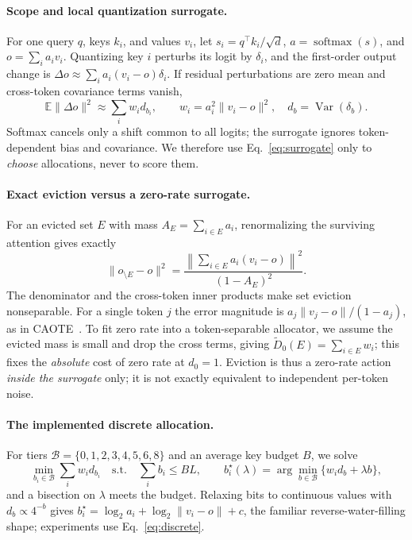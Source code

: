 \documentclass{article}
\theoremstyle{definition}
\begin{document}
\paragraph{Scope and local quantization surrogate.}
For one query $q$, keys $k_i$, and values $v_i$, let
$s_i=q^\top k_i/\sqrt d$, $a=\operatorname{softmax}(s)$, and
$o=\sum_i a_i v_i$.  Quantizing key $i$ perturbs its logit by $\delta_i$, and the first-order output change is $\Delta o \approx \sum_i a_i(v_i-o)\delta_i$.
If residual perturbations are zero mean and cross-token covariance terms vanish,
\begin{equation}
  \mathbb E\|\Delta o\|^2
  \approx \sum_i w_i d_{b_i}, \qquad
  w_i=a_i^2\|v_i-o\|^2,\quad d_b=\operatorname{Var}(\delta_b).
  \label{eq:surrogate}
\end{equation}
Softmax cancels only a shift common to all logits; the surrogate ignores token-dependent bias and covariance.  We therefore use Eq.~\ref{eq:surrogate} only to \emph{choose} allocations, never to score them.

\paragraph{Exact eviction versus a zero-rate surrogate.}
For an evicted set $E$ with mass $A_E=\sum_{i\in E}a_i$, renormalizing the surviving attention gives exactly
\begin{equation}
 \|o_{\setminus E}-o\|^2
 =\frac{\left\|\sum_{i\in E}a_i(v_i-o)\right\|^2}{(1-A_E)^2}.
 \label{eq:exact-eviction}
\end{equation}
The denominator and the cross-token inner products make set eviction nonseparable.  For a single token $j$ the error magnitude is $a_j\|v_j-o\|/(1-a_j)$, as in CAOTE~\citep{goel2025caote}.
To fit zero rate into a token-separable allocator, we assume the evicted mass is small and drop the cross terms, giving
$\widetilde D_0(E)=\sum_{i\in E}w_i$; this fixes the \emph{absolute} cost of zero rate at $d_0=1$.  Eviction is thus a zero-rate action \emph{inside the surrogate} only; it is not exactly equivalent to independent per-token noise.

\paragraph{The implemented discrete allocation.}
For tiers $\mathcal B=\{0,1,2,3,4,5,6,8\}$ and an average key budget $B$, we solve
\begin{equation}
 \min_{b_i\in\mathcal B}\sum_i w_i d_{b_i}
 \quad\text{s.t.}\quad \sum_i b_i\le BL,
 \qquad
 b_i^\star(\lambda)=\arg\min_{b\in\mathcal B}\{w_i d_b+\lambda b\},
 \label{eq:discrete}
\end{equation}
and a bisection on $\lambda$ meets the budget.  Relaxing bits to continuous values with $d_b\propto4^{-b}$ gives $b_i^\star=\log_2a_i+\log_2\|v_i-o\|+c$, the familiar reverse-water-filling shape; experiments use Eq.~\ref{eq:discrete}.
\end{document}
